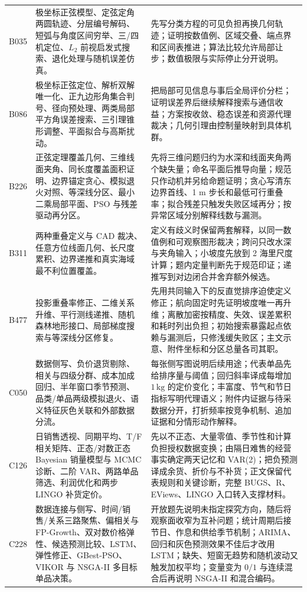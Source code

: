\begin{longtable}{p{1.4cm}p{5.2cm}p{7.0cm}}
B035 & 极坐标正弦模型、定弦定角两圆轨迹、分层编号解码、短弧与角度区间穷举、三/四机定位、$L_2$ 前视启发式搜索、退化处理与随机误差仿真。 &
先写分类方程的可见负担再换几何轨迹；证明按数值例、区域交叠、端点界和区间表推进；算法比较允许局部让步；数值极限与实际停止分开说明。\\
B086 & 极坐标正弦定位、解析双解唯一化、正九边形角集合判号、径向预处理、两类局部平方角误差搜索、三引理锥形调整、平面拟合与高斯扰动。 &
把局部可见信息与事后全局评价分栏；证明误差界后继续解释搜索与通信收益；方案按收敛、稳态误差和资源代理裁决；几何引理由控制量映射到具体机群。\\
B226 & 正弦定理覆盖几何、三维线面夹角、同长度覆盖面积证明、边界锚定贪心、模拟退火对照、等深线分区、最小二乘局部平面、PSO 与残差驱动再分区。 &
先将三维问题归约为水深和线面夹角两个缺失量；命名平面后推导向量；规范只作动机并另给命题证明；贪心写清东边界首线、1 m 步长和最低可行重叠率；拟合残差只触发失败区域再分；按异常区域分别解释线数与漏测。\\
B311 & 两种重叠定义与 CAD 裁决、任意方位线面几何、长尺度累积、边界递推和真实海域最不利位置覆盖。 &
定义有歧义时保留两套解释，以同一数值例和可观察图形裁决；跨问只改水深与夹角输入；小坡度先放到 2 海里尺度计算；题内定量判断先于规范印证；递推写到对边闭合并舍弃额外候选。\\
B477 & 投影重叠率修正、二维关系升维、平行测线递推、随机森林地形接口、局部梯度搜索与等深线分区修复。 &
先用共同输入下的反直觉排序迫使定义修正；航向固定时先证明坡度唯一再升维；离散加密按精度、失效、误差累积和耗时列出负担；初始搜索暴露起点依赖与漏测后，只修浅缓失败区；主文示意、附件坐标和分区总量各司其职。\\
C050 & 数据侧写、负价退货剔除、相关与四级分群、成本加成回归、半年窗口季节预测、品类/单品两级模拟退火、语义特征灰色关联和外部数据分流。 &
每张侧写图说明后续用途；代表单品先给排序量与阈值；回归斜率译成每增加 $1\,\mathrm{kg}$ 的定价变化；丰富度、节气和节日指标写明代理语义；附件内证据与待采数据分开，打折频率按竞争机制、追加证据和分情形动作解释。\\
C126 & 日销售透视、同期平均、T/F 相关矩阵、正态/对数正态 Bayesian 销量模型与 MCMC 诊断、二阶 VAR、两路单品筛选、利润优化和两步 LINGO 补货定价。 &
先以不正态、大量零值、季节性和计算负担授权数据变换；由隔日难售的经营事实确定两天记忆和 VAR(2)；把负预测译成余货、折价与不补货；正文保留代表规则和关键诊断，完整 BUGS、R、EViews、LINGO 入口转入支撑材料。\\
C228 & 数据连接与侧写、时间/销售/关系三路聚焦、偏相关与 FP-Growth、双对数价格弹性、候选预测比较、LSTM、弹性修正、GBest-PSO、VIKOR 与 NSGA-II 多目标单品决策。 &
开放题先说明未指定探究方向，随后将观察面收窄为互补问题；统计周期后接节日、作息和供给季节机制；ARIMA、回归和灰色预测效果不佳后才改用 LSTM；缺失、短窗无趋势和随机波动又触发加权平均；变量变为 $0/1$ 与连续混合后再说明 NSGA-II 和混合编码。\\

\end{longtable}
